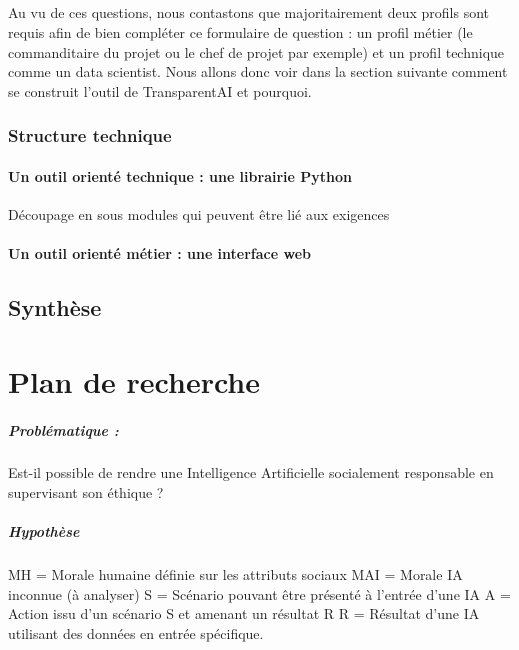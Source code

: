 \documentclass[10pt, french, a4paper]{report}
\begin{document}
\paragraph{}
Au vu de ces questions, nous contastons que majoritairement deux profils sont requis afin de bien compléter ce formulaire de question : un profil métier (le commanditaire du projet ou le chef de projet par exemple) et un profil technique comme un data scientist. Nous allons donc voir dans la section suivante comment se construit l'outil de TransparentAI et pourquoi.

\subsection{Structure technique}

\subsubsection{Un outil orienté technique : une librairie Python}

Découpage en sous modules qui peuvent être lié aux exigences

\subsubsection{Un outil orienté métier : une interface web}


\section{Synthèse}


\newpage
\chapter{Plan de recherche}


\paragraph{Problématique :}
Est-il possible de rendre une Intelligence Artificielle socialement responsable en supervisant son éthique ?

\paragraph{Hypothèse}
MH = Morale humaine définie sur les attributs sociaux 
MAI = Morale IA inconnue (à analyser)
S = Scénario pouvant être présenté à l'entrée d'une IA
A = Action issu d'un scénario S et amenant un résultat R
R = Résultat d'une IA utilisant des données en entrée spécifique.
\end{document}
